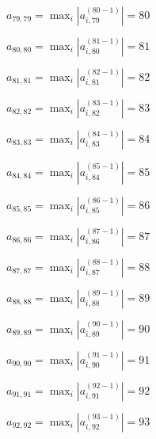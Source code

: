 \documentclass[a4paper,12pt]{article}
\begin{document}
$a _{ 79, 79 } =  \max _i |a _{ i, 79 } ^{ (80 - 1) } | = 80$

$a _{ 80, 80 } =  \max _i |a _{ i, 80 } ^{ (81 - 1) } | = 81$

$a _{ 81, 81 } =  \max _i |a _{ i, 81 } ^{ (82 - 1) } | = 82$

$a _{ 82, 82 } =  \max _i |a _{ i, 82 } ^{ (83 - 1) } | = 83$

$a _{ 83, 83 } =  \max _i |a _{ i, 83 } ^{ (84 - 1) } | = 84$

$a _{ 84, 84 } =  \max _i |a _{ i, 84 } ^{ (85 - 1) } | = 85$

$a _{ 85, 85 } =  \max _i |a _{ i, 85 } ^{ (86 - 1) } | = 86$

$a _{ 86, 86 } =  \max _i |a _{ i, 86 } ^{ (87 - 1) } | = 87$

$a _{ 87, 87 } =  \max _i |a _{ i, 87 } ^{ (88 - 1) } | = 88$

$a _{ 88, 88 } =  \max _i |a _{ i, 88 } ^{ (89 - 1) } | = 89$

$a _{ 89, 89 } =  \max _i |a _{ i, 89 } ^{ (90 - 1) } | = 90$

$a _{ 90, 90 } =  \max _i |a _{ i, 90 } ^{ (91 - 1) } | = 91$

$a _{ 91, 91 } =  \max _i |a _{ i, 91 } ^{ (92 - 1) } | = 92$

$a _{ 92, 92 } =  \max _i |a _{ i, 92 } ^{ (93 - 1) } | = 93$
\end{document}
